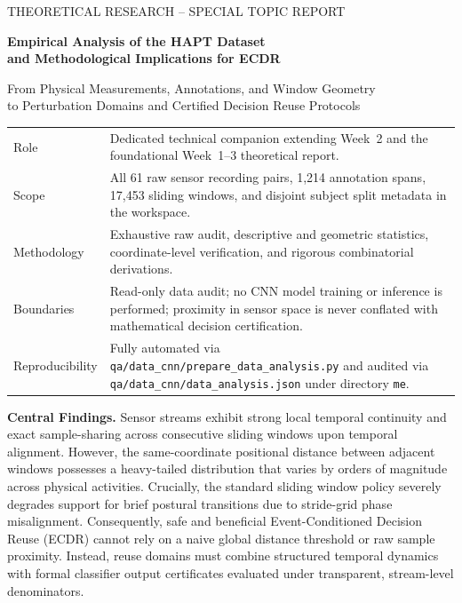\documentclass[11pt,a4paper]{article}
\newcommand{\code}[1]{{\small\ttfamily\nolinkurl{#1}}}
\theoremstyle{definition}
\begin{document}
\hypersetup{pageanchor=false}
\begin{titlepage}
\vspace*{1.0cm}
{\Large\color{teal} THEORETICAL RESEARCH -- SPECIAL TOPIC REPORT\par}
\vspace{0.6cm}
{\huge\bfseries\color{ink} Empirical Analysis of the HAPT Dataset\\and Methodological Implications for ECDR\par}
\vspace{0.7cm}
{\Large From Physical Measurements, Annotations, and Window Geometry\\to Perturbation Domains and Certified Decision Reuse Protocols\par}
\vspace{1cm}
\begin{tabularx}{\linewidth}{@{}P{3.2cm}Y@{}}\toprule
Role & Dedicated technical companion extending Week~2 and the foundational Week~1--3 theoretical report.\\
Scope & All 61 raw sensor recording pairs, 1,214 annotation spans, 17,453 sliding windows, and disjoint subject split metadata in the workspace.\\
Methodology & Exhaustive raw audit, descriptive and geometric statistics, coordinate-level verification, and rigorous combinatorial derivations.\\
Boundaries & Read-only data audit; no CNN model training or inference is performed; proximity in sensor space is never conflated with mathematical decision certification.\\
Reproducibility & Fully automated via \code{qa/data_cnn/prepare_data_analysis.py} and audited via \code{qa/data_cnn/data_analysis.json} under directory \code{me}.\\\bottomrule
\end{tabularx}
\vfill
\textbf{Central Findings.} Sensor streams exhibit strong local temporal continuity and exact sample-sharing across consecutive sliding windows upon temporal alignment. However, the same-coordinate positional distance between adjacent windows possesses a heavy-tailed distribution that varies by orders of magnitude across physical activities. Crucially, the standard sliding window policy severely degrades support for brief postural transitions due to stride-grid phase misalignment. Consequently, safe and beneficial Event-Conditioned Decision Reuse (ECDR) cannot rely on a naive global distance threshold or raw sample proximity. Instead, reuse domains must combine structured temporal dynamics with formal classifier output certificates evaluated under transparent, stream-level denominators.
\end{titlepage}
\hypersetup{pageanchor=true}
\end{document}
